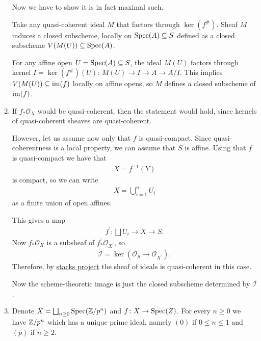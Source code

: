\begin{exercise}{4}
\begin{enumerate}
{            Now we have to show it is in fact maximal such.

            Take any quasi-coherent ideal $M$ that factors through $\ker(f^\#)$.
            Sheaf $M$ induces a closed subscheme, locally on $\operatorname{Spec}(A) \subseteq
            S$ defined as a closed subscheme $V(M(U)) \subseteq \operatorname{Spec}(A)$.

            For any affine open $U = \operatorname{Spec}(A) \subseteq S$, the ideal $M(U)$
            factors through kernel $I = \ker(f^\#)(U)$: $M(U) \to I \to A \to
            A/I$. This implies $V(M(U)) \subseteq \operatorname{im}(f)$ locally on affine
            opens, so $M$ defines a closed subscheme of $\operatorname{im}(f)$.
            }
        \item{
            If $f_* \mathcal{O}_X$ would be quasi-coherent, then the statement
            would hold, since kernels of quasi-coherent sheaves are
            quasi-coherent.

            However, let us assume now only that $f$ is quasi-compact.
            Since quasi-coherentness is a local property, we can assume that $S$ is affine.
            Using that $f$ is quasi-compact we have that
            \begin{align*}
                X=f^{-1}(Y)
            \end{align*}
            is compact, so we can write 
            \begin{align*}
                X=\bigcup_{i=1}^n U_i
            \end{align*}
            as a finite union of open affines.

            This gives a map 
            \begin{align*}
                f^{\prime}:\bigsqcup U_i \to X \to S.
            \end{align*}
            Now $f_*\mathcal{O}_X$ is a subsheaf of $f^{\prime}_*\mathcal{O}_{X^\prime}$,
            so 
            \begin{align*}
                \mathcal{I}=\ker(\mathcal{O}_S \to \mathcal{O}_{X^\prime}).
            \end{align*}
            Therefore, by \href{https://stacks.math.columbia.edu/tag/01LC}{stacks project}
            the sheaf of ideals is quasi-coherent in this case.

            Now the scheme-theoretic image is just the closed subscheme determined by $\mathcal{I}$.
            }
        \item{
            Denote $X = \bigsqcup_{n \geq 0} \operatorname{Spec}(\mathbb{Z} / p^n)$ and $f \colon X
            \to \operatorname{Spec}(Z)$.
            For every $n \geq 0$ we have $\mathbb{Z}/p^n$ which has a unique prime
            ideal, namely $(0)$ if $0 \leq n \leq 1$ and $(p)$ if $n \geq 2$.

}
\end{enumerate}
\end{exercise}
